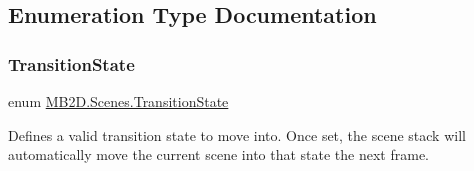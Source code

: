 \subsection{Enumeration Type Documentation}
\hypertarget{namespace_m_b2_d_1_1_scenes_a0e0db3f97bbaa272f70534c5954c4acc}{}\label{namespace_m_b2_d_1_1_scenes_a0e0db3f97bbaa272f70534c5954c4acc} 
\subsubsection{\texorpdfstring{Transition\+State}{TransitionState}}
{\footnotesize\ttfamily enum \hyperlink{namespace_m_b2_d_1_1_scenes_a0e0db3f97bbaa272f70534c5954c4acc}{M\+B2\+D.\+Scenes.\+Transition\+State}\hspace{0.3cm}{\ttfamily [strong]}}



Defines a valid transition state to move into. Once set, the scene stack will automatically move the current scene into that state the next frame. 


